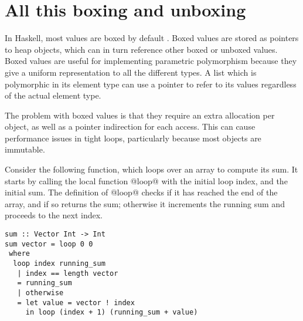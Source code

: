 % 
% 
% 



\section{All this boxing and unboxing}
In Haskell, most values are boxed by default \citep{jones1991unboxed}.
Boxed values are stored as pointers to heap objects, which can in turn reference other boxed or unboxed values.
Boxed values are useful for implementing parametric polymorphism because they give a uniform representation to all the different types.
A list which is polymorphic in its element type can use a pointer to refer to its values regardless of the actual element type.

The problem with boxed values is that they require an extra allocation per object, as well as a pointer indirection for each access.
This can cause performance issues in tight loops, particularly because most objects are immutable.

Consider the following function, which loops over an array to compute its sum.
It starts by calling the local function @loop@ with the initial loop index, and the initial sum.
The definition of @loop@ checks if it has reached the end of the array, and if so returns the sum; otherwise it increments the running sum and proceeds to the next index.

\begin{lstlisting}
sum :: Vector Int -> Int
sum vector = loop 0 0
 where
  loop index running_sum
   | index == length vector
   = running_sum
   | otherwise
   = let value = vector ! index
     in loop (index + 1) (running_sum + value)
\end{lstlisting}

